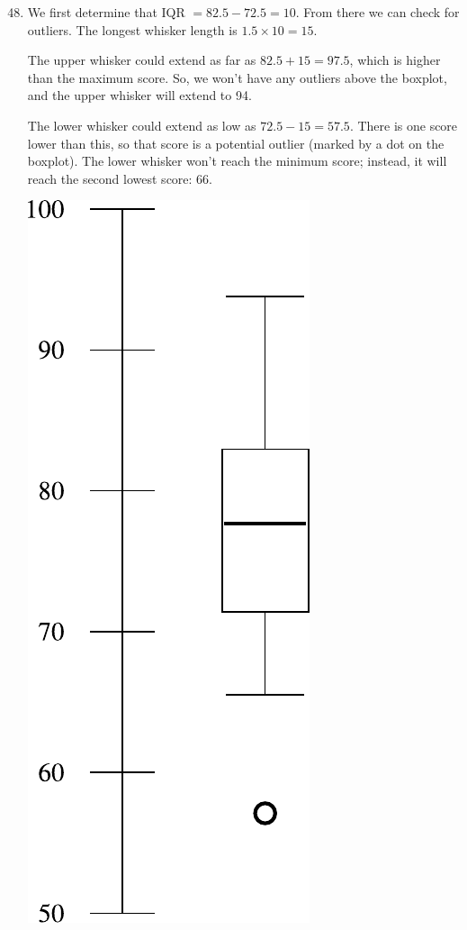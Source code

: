 \documentclass[12pt,letterpaper]{article}
\begin{document}
\begin{enumerate}
\setcounter{enumi}{47}

\item We first determine that IQR $ = 82.5-72.5 = 10$. From there we can check for outliers. The longest whisker length is $1.5\times 10 = 15$. 

The upper whisker could extend as far as $82.5+15 = 97.5$, which is higher than the maximum score. So, we won't have any outliers above the boxplot, and the upper whisker will extend to 94.

The lower whisker could extend as low as $72.5-15 = 57.5$. There is one score lower than this, so that score is a potential outlier (marked by a dot on the boxplot). The lower whisker won't reach the minimum score; instead, it will reach the second lowest score: 66.

\begin{center}
\includegraphics[scale=0.7]{figures/boxplot.pdf} 
\end{center}




\end{enumerate}
\end{document}

